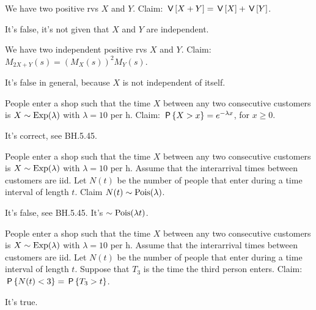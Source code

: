 \documentclass[tf-tutorial-all.tex]{subfiles}
\begin{document}
\begin{truefalse}
We have two positive rvs $X$ and $Y$. Claim: $\V{X+Y} = \V X + \V Y$.
\begin{solution}
It's false, it's not given that $X$  and $Y$ are independent.
\end{solution}
\end{truefalse}



\begin{truefalse}
We have two independent positive rvs $X$ and $Y$. Claim: $M_{2X+Y}(s)  = (M_{X}(s))^{2} M_{Y}(s)$.
\begin{solution}
It's false in general, because $X$ is not independent of itself.
\end{solution}
\end{truefalse}




\begin{truefalse}
People enter a shop such that the time $X$ between  any two consecutive customers is $X\sim \Exp{\lambda}$ with $\lambda=10$ per h. Claim: $\P{X > x} = e^{-\lambda x}$, for $x\geq 0$.
\begin{solution}
It's correct, see BH.5.45.
\end{solution}
\end{truefalse}

\begin{truefalse}
People enter a shop such that the time $X$ between any two consecutive customers is $X\sim \Exp{\lambda}$ with $\lambda=10$ per h.
Assume that the interarrival times between customers are iid.
Let $N(t)$ be the number of people that enter during a time interval of length $t$.
Claim $N(t) \sim \Pois{\lambda}$.
\begin{solution}
It's false, see BH.5.45. It's $\sim \Pois{\lambda t}$.
\end{solution}
\end{truefalse}

\begin{truefalse}
People enter a shop such that the time $X$ between any two consecutive customers is $X\sim \Exp{\lambda}$ with $\lambda=10$ per h.
Assume that the interarrival times between customers are iid.
Let $N(t)$ be the number of people that enter during a time interval of length $t$.
Suppose that $T_{3}$ is the time the third person enters.
Claim: $\P{N(t) <3} = \P{T_{3}>t}$.
\begin{solution}
It's true.
\end{solution}
\end{truefalse}
\end{document}
